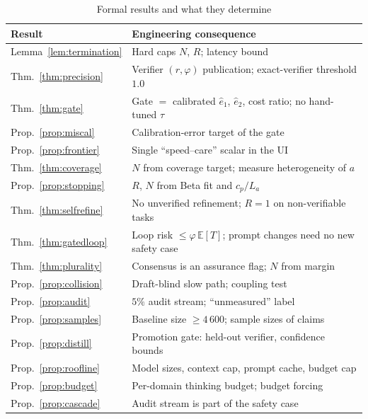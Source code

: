 \begin{table}[t]
\caption{Formal results and what they determine}
\label{tab:consequences}
\centering\small
\begin{tabular}{@{}p{2.2cm}p{5.8cm}@{}}
\toprule
Result & Engineering consequence \\
\midrule
Lemma~\ref{lem:termination} & Hard caps $N$, $R$; latency bound \\
Thm.~\ref{thm:precision} & Verifier $(r,\varphi)$ publication; exact-verifier threshold $1.0$ \\
Thm.~\ref{thm:gate} & Gate $=$ calibrated $\hat e_1$, $\hat e_2$, cost ratio; no hand-tuned $\tau$ \\
Prop.~\ref{prop:miscal} & Calibration-error target of the gate \\
Prop.~\ref{prop:frontier} & Single ``speed--care'' scalar in the UI \\
Thm.~\ref{thm:coverage} & $N$ from coverage target; measure heterogeneity of $a$ \\
Prop.~\ref{prop:stopping} & $R$, $N$ from Beta fit and $c_p/L_a$ \\
Thm.~\ref{thm:selfrefine} & No unverified refinement; $R=1$ on non-verifiable tasks \\
Thm.~\ref{thm:gatedloop} & Loop risk $\le\varphi\,\mathbb E[T]$; prompt changes need no new safety case \\
Thm.~\ref{thm:plurality} & Consensus is an assurance flag; $N$ from margin \\
Prop.~\ref{prop:collision} & Draft-blind slow path; coupling test \\
Prop.~\ref{prop:audit} & $5\%$ audit stream; ``unmeasured'' label \\
Prop.~\ref{prop:samples} & Baseline size $\ge4\,600$; sample sizes of claims \\
Prop.~\ref{prop:distill} & Promotion gate: held-out verifier, confidence bounds \\
Prop.~\ref{prop:roofline} & Model sizes, context cap, prompt cache, budget cap \\
Prop.~\ref{prop:budget} & Per-domain thinking budget; budget forcing \\
Prop.~\ref{prop:cascade} & Audit stream is part of the safety case \\
\bottomrule
\end{tabular}
\end{table}
